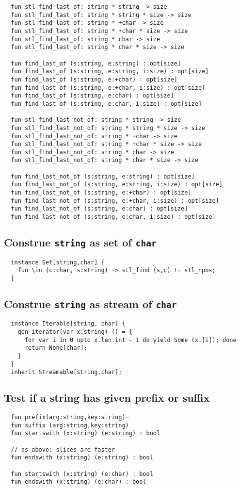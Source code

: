 \documentclass[oneside]{book}
\begin{document}
\begin{verbatim}
  fun stl_find_last_of: string * string -> size
  fun stl_find_last_of: string * string * size -> size
  fun stl_find_last_of: string * +char -> size
  fun stl_find_last_of: string * +char * size -> size
  fun stl_find_last_of: string * char -> size
  fun stl_find_last_of: string * char * size -> size

  fun find_last_of (s:string, e:string) : opt[size]
  fun find_last_of (s:string, e:string, i:size) : opt[size]
  fun find_last_of (s:string, e:+char) : opt[size]
  fun find_last_of (s:string, e:+char, i:size) : opt[size]
  fun find_last_of (s:string, e:char) : opt[size]
  fun find_last_of (s:string, e:char, i:size) : opt[size]

  fun stl_find_last_not_of: string * string -> size
  fun stl_find_last_not_of: string * string * size -> size
  fun stl_find_last_not_of: string * +char -> size
  fun stl_find_last_not_of: string * +char * size -> size
  fun stl_find_last_not_of: string * char -> size
  fun stl_find_last_not_of: string * char * size -> size

  fun find_last_not_of (s:string, e:string) : opt[size]
  fun find_last_not_of (s:string, e:string, i:size) : opt[size]
  fun find_last_not_of (s:string, e:+char) : opt[size]
  fun find_last_not_of (s:string, e:+char, i:size) : opt[size]
  fun find_last_not_of (s:string, e:char) : opt[size]
  fun find_last_not_of (s:string, e:char, i:size) : opt[size]
\end{verbatim}

  
\subsection{Construe {\tt string} as set of {\tt char}}
\begin{verbatim}
  instance Set[string,char] {
    fun \in (c:char, s:string) => stl_find (s,c) != stl_npos;
  }
\end{verbatim}
  
\subsection{Construe {\tt string} as stream of {\tt char}}
\begin{verbatim}
  instance Iterable[string, char] {
    gen iterator(var x:string) () = {
      for var i in 0 upto x.len.int - 1 do yield Some (x.[i]); done
      return None[char];
    }
  }
  inherit Streamable[string,char];
\end{verbatim}

\subsection{Test if a string has given prefix or suffix}
\begin{verbatim}
  fun prefix(arg:string,key:string)=
  fun suffix (arg:string,key:string)
  fun startswith (x:string) (e:string) : bool

  // as above: slices are faster
  fun endswith (x:string) (e:string) : bool

  fun startswith (x:string) (e:char) : bool 
  fun endswith (x:string) (e:char) : bool
\end{verbatim}
\end{document}

